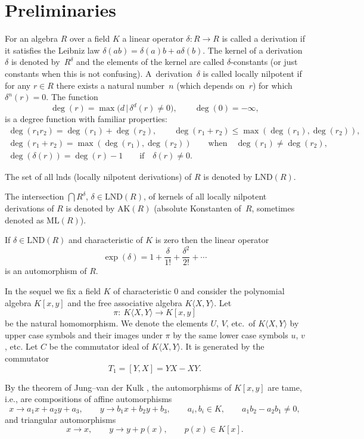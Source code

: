\section{Preliminaries}\label{section2}

For an algebra $R$ over a field $K$ a linear operator $\delta\colon R\rightarrow R$ is called a derivation if it satisfies the Leibniz law $\delta(ab) = \delta(a)b + a\delta(b)$.
The kernel of a derivation $\delta$ is denoted by~$R^{\delta}$ and the elements of the kernel are called $\delta$-constants (or just constants when this is not confusing).
A~derivation~$\delta$ is called locally nilpotent if for any $r \in R$ there exists a natural number~$n$ (which depends on~$r$) for which $\delta^n(r) = 0$. The function
\[
\deg(r) = \max\big(d\,|\, \delta^d(r) \neq 0\big), \qquad \deg(0) = -\infty,
\]
is a degree function with familiar properties:
\begin{gather*}
\deg(r_1r_2) = \deg(r_1) + \deg(r_2),\qquad \deg(r_1 + r_2) \leq \max(\deg(r_1), \deg(r_2)),\\
\deg(r_1 + r_2) =\max(\deg(r_1), \deg(r_2)) \qquad \text{when} \quad \deg(r_1) \neq \deg(r_2),\\
\deg(\delta(r)) = \deg(r) - 1\qquad \text{if} \quad \delta(r) \neq 0.
\end{gather*}

The set of all lnds (locally nilpotent derivations) of $R$ is denoted by $\text{LND}(R)$.

The intersection $\bigcap R^{\delta}$, $\delta \in \text{LND}(R)$, of kernels of all locally nilpotent derivations of $R$ is denoted by $\text{AK}(R)$ (absolute Konstanten of~$R$, sometimes denoted as $\text{ML}(R)$).

If $\delta \in \text{LND}(R)$ and characteristic of $K$ is zero then the linear operator
\[
\exp(\delta)=1+\frac{\delta}{1!}+\frac{\delta^2}{2!}+\cdots
\]
is an automorphism of $R$.

In the sequel we fix a field $K$ of characteristic 0 and consider the polynomial algebra $K[x,y]$ and the free associative algebra $K\langle X,Y\rangle$. Let
\[
\pi\colon \ K\langle X,Y\rangle\to K[x,y]
\]
be the natural homomorphism. We denote the elements $U$, $V$, etc.\ of $K\langle X,Y\rangle$ by upper case symbols and their images under $\pi$ by the same lower case symbols $u$, $v$, etc. Let $C$ be the commutator ideal of $K\langle X,Y\rangle$. It is generated by the commutator
\[
T_1 = [Y, X] = YX - XY.
\]

By the theorem of Jung--van der Kulk \cite{J, K}, the automorphisms of $K[x,y]$ are tame, i.e., are compositions of affine automorphisms
\[
x \rightarrow a_1 x + a_2 y + a_3, \qquad y \rightarrow b_1 x + b_2 y + b_3, \qquad a_i,b_i\in K,\qquad a_1b_2 - a_2b_1 \neq 0,
\]
and triangular automorphisms
\[
x \rightarrow x, \qquad y \rightarrow y + p(x),\qquad p(x)\in K[x].
\]

